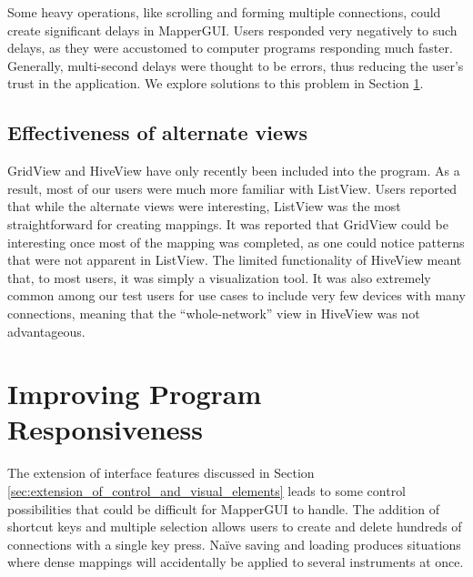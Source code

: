 Some heavy operations, like scrolling and forming multiple connections, could create significant delays in MapperGUI. Users responded very negatively to such delays, as they were accustomed to computer programs responding much faster. Generally, multi-second delays were thought to be errors, thus reducing the user's trust in the application. We explore solutions to this problem in Section \ref{sec:testing_program_responsiveness}.
	

	\subsection{Effectiveness of alternate views} %
	\label{sub:effectiveness_of_alternate_views}

GridView and HiveView have only recently been included into the program. As a result, most of our users were much more familiar with ListView. Users reported that while the alternate views were interesting, ListView was the most straightforward for creating mappings. It was reported that GridView could be interesting once most of the mapping was completed, as one could notice patterns that were not apparent in ListView. The limited functionality of HiveView meant that, to most users, it was simply a visualization tool. It was also extremely common among our test users for use cases to include very few devices with many connections, meaning that the ``whole-network'' view in HiveView was not advantageous.
	
	

\section{Improving Program Responsiveness} %
\label{sec:testing_program_responsiveness}

The extension of interface features discussed in Section \ref{sec:extension_of_control_and_visual_elements} leads to some control possibilities that could be difficult for MapperGUI to handle. The addition of shortcut keys and multiple selection allows users to create and delete hundreds of connections with a single key press. Na\"{i}ve saving and loading produces situations where dense mappings will accidentally be applied to several instruments at once.

